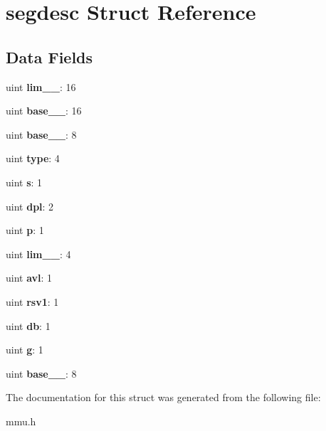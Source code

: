 \hypertarget{structsegdesc}{}\section{segdesc Struct Reference}
\label{structsegdesc}
\subsection*{Data Fields}
\begin{DoxyCompactItemize}
\item 
\mbox{\label{structsegdesc_a021002a4cf151893b5b8034b09cc7530}} 
uint {\bfseries lim\+\_\+\_}\+: 16
\item 
\mbox{\label{structsegdesc_aaf95dd5b9105cf5729de49eb2542072a}} 
uint {\bfseries base\+\_\+\_}\+: 16
\item 
\mbox{\label{structsegdesc_aa5cff1f1ddfac386e2268108c8f5b6c2}} 
uint {\bfseries base\+\_\+\_}\+: 8
\item 
\mbox{\label{structsegdesc_acb54ea5ee6d09cfcc8b4dd3e96e4ce5b}} 
uint {\bfseries type}\+: 4
\item 
\mbox{\label{structsegdesc_aacc67bb0857f0c77c1f8a5c9b8a1ac09}} 
uint {\bfseries s}\+: 1
\item 
\mbox{\label{structsegdesc_ab22349cefd6990e4a9a1d93e42ee0c03}} 
uint {\bfseries dpl}\+: 2
\item 
\mbox{\label{structsegdesc_a322a34a84a3815d35ebb3aa50c5a55e2}} 
uint {\bfseries p}\+: 1
\item 
\mbox{\label{structsegdesc_abbc27a39a2ad6e59faa2eca33d7dfa0c}} 
uint {\bfseries lim\+\_\+\_}\+: 4
\item 
\mbox{\label{structsegdesc_a6623d25de54a0a87d7a43ea4dfe7783f}} 
uint {\bfseries avl}\+: 1
\item 
\mbox{\label{structsegdesc_a5798904f15e8fb63d2dd37e8a2818f0a}} 
uint {\bfseries rsv1}\+: 1
\item 
\mbox{\label{structsegdesc_a08edbd480d21bfd147e304b6f5a3788f}} 
uint {\bfseries db}\+: 1
\item 
\mbox{\label{structsegdesc_a6af7593606fa1a1ff003b4a78facc8e0}} 
uint {\bfseries g}\+: 1
\item 
\mbox{\label{structsegdesc_a164a6a2e75fc62e61daef3ddab7f3169}} 
uint {\bfseries base\+\_\+\_}\+: 8
\end{DoxyCompactItemize}


The documentation for this struct was generated from the following file\+:\begin{DoxyCompactItemize}
\item 
mmu.\+h\end{DoxyCompactItemize}
